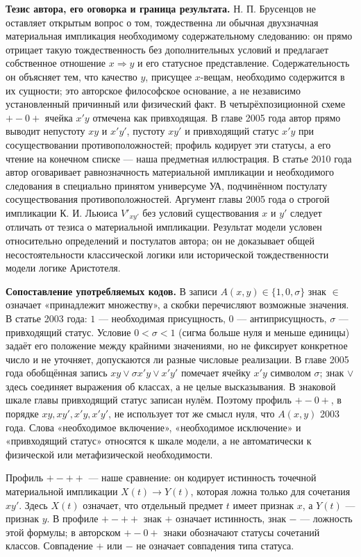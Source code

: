 \documentclass[12pt,a4paper]{article}
\begin{document}
\textbf{Тезис автора, его оговорка и граница результата.} Н. П. Брусенцов не оставляет открытым вопрос о том, тождественна ли обычная двухзначная материальная импликация необходимому содержательному следованию: он прямо отрицает такую тождественность без дополнительных условий и предлагает собственное отношение \(x\Rightarrow y\) и его статусное представление. Содержательность он объясняет тем, что качество \(y\), присущее \(x\)-вещам, необходимо содержится в их сущности; это авторское философское основание, а не независимо установленный причинный или физический факт. В четырёхпозиционной схеме \(+-0+\) ячейка \(x'y\) отмечена как привходящая. В главе 2005 года автор прямо выводит непустоту \(xy\) и \(x'y'\), пустоту \(xy'\) и привходящий статус \(x'y\) при сосуществовании противоположностей; профиль кодирует эти статусы, а его чтение на конечном списке — наша предметная иллюстрация. В статье 2010 года автор оговаривает равнозначность материальной импликации и необходимого следования в специально принятом универсуме \(\text{УА}\), подчинённом постулату сосуществования противоположностей. Аргумент главы 2005 года о строгой импликации К. И. Льюиса \(V'_{xy'}\) без условий существования \(x\) и \(y'\) следует отличать от тезиса о материальной импликации. Результат модели условен относительно определений и постулатов автора; он не доказывает общей несостоятельности классической логики или исторической тождественности модели логике Аристотеля.

\textbf{Сопоставление употребляемых кодов.} В записи \(A(x,y)\in\{1,0,\sigma\}\) знак \(\in\) означает «принадлежит множеству», а скобки перечисляют возможные значения. В статье 2003 года: \(1\) — необходимая присущность, \(0\) — антиприсущность, \(\sigma\) — привходящий статус. Условие \(0<\sigma<1\) (сигма больше нуля и меньше единицы) задаёт его положение между крайними значениями, но не фиксирует конкретное число и не уточняет, допускаются ли разные числовые реализации. В главе 2005 года обобщённая запись \(xy\lor\sigma x'y\lor x'y'\) помечает ячейку \(x'y\) символом \(\sigma\); знак \(\lor\) здесь соединяет выражения об классах, а не целые высказывания. В знаковой шкале главы привходящий статус записан нулём. Поэтому профиль \(+-0+\), в порядке \(xy,xy',x'y,x'y'\), не использует тот же смысл нуля, что \(A(x,y)\) 2003 года. Слова «необходимое включение», «необходимое исключение» и «привходящий статус» относятся к шкале модели, а не автоматически к физической или метафизической необходимости.

Профиль \(+-++\) — наше сравнение: он кодирует истинность точечной материальной импликации \(X(t)\to Y(t)\), которая ложна только для сочетания \(xy'\). Здесь \(X(t)\) означает, что отдельный предмет \(t\) имеет признак \(x\), а \(Y(t)\) — признак \(y\). В профиле \(+-++\) знак \(+\) означает истинность, знак \(-\) — ложность этой формулы; в авторском \(+-0+\) знаки обозначают статусы сочетаний классов. Совпадение \(+\) или \(-\) не означает совпадения типа статуса.
\end{document}
